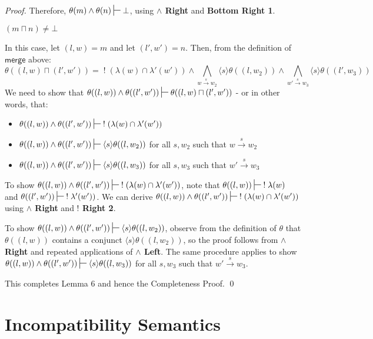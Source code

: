 \begin{proof}
Therefore,  $\theta(m) \land \theta(n) \judge \bot$, using  {\bf $\land$ Right} and  {\bf Bottom Right 1}.
\begin{mycase}
$(m \sqcap n) \neq \bot$
\end{mycase}
In this case, let $(l,w) = m$ and let $(l',w')=n$.
Then, from the definition of $\mathsf{merge}$ above:
\[
\theta((l,w) \sqcap (l',w')) = \; ! \; (\lambda(w) \cap \lambda'(w')) \land \bigwedge_{w \xrightarrow{s} w_2} \langle s \rangle \theta((l, w_2)) \land \bigwedge_{w' \xrightarrow{s} w_3} \langle s \rangle \theta((l', w_3))
\]
We need to show that $\theta((l,w)) \land \theta((l',w')) \judge \theta((l,w) \sqcap (l',w'))$ - or in other words, that:
\begin{itemize}
\item
$\theta((l,w)) \land \theta((l',w')) \judge \; ! \; (\lambda(w) \cap \lambda'(w'))$
\item
$\theta((l,w)) \land \theta((l',w')) \judge \langle s \rangle \theta((l, w_2))$ for all $s,w_2$ such that $w \xrightarrow{s} w_2$
\item
$\theta((l,w)) \land \theta((l',w')) \judge \langle s \rangle \theta((l, w_3))$ for all $s,w_3$ such that $w' \xrightarrow{s} w_3$
\end{itemize}
To show $\theta((l,w)) \land \theta((l',w')) \judge \; ! \; (\lambda(w) \cap \lambda'(w'))$, note that $\theta((l,w))  \judge \; ! \; \lambda(w)$ and $\theta((l',w')) \judge \; ! \;  \lambda'(w'))$.
We can derive $\theta((l,w)) \land \theta((l',w')) \judge \; ! \; (\lambda(w) \cap \lambda'(w'))$ using {\bf $\land$ Right} and {\bf $!$ Right 2}. 

To show $\theta((l,w)) \land \theta((l',w')) \judge \langle s \rangle \theta((l, w_2))$, observe from the definition of $\theta$ that $\theta((l,w))$ contains a conjunct $\langle s \rangle \theta((l, w_2))$, so the proof follows from  {\bf $\land$ Right} and repeated applications of  {\bf $\land$ Left}. The same procedure applies to show $\theta((l,w)) \land \theta((l',w')) \judge \langle s \rangle \theta((l, w_3))$ for all $s,w_3$ such that $w' \xrightarrow{s} w_3$.

This completes Lemma 6 and hence the Completeness Proof.
\qed

\end{proof}

\section{Incompatibility Semantics}

